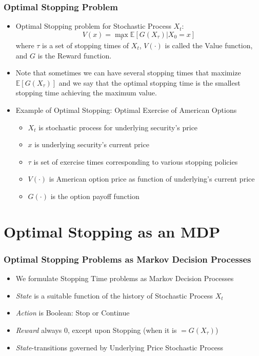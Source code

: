 \documentclass{beamer}
\begin{document}
\begin{frame}
\frametitle{Optimal Stopping Problem}
\begin{itemize}
\item Optimal Stopping problem for Stochastic Process $X_t$: 
$$V(x) = \max_{\tau} \mathbb{E}[G(X_{\tau})|X_0 = x]$$
 where $\tau$ is a set of stopping times of $X_t$, $V(\cdot)$ is called the Value function, and $G$ is the Reward function.
\item Note that sometimes we can have several stopping times that maximize $\mathbb{E}[G(X_{\tau})]$ and we say that the optimal stopping time
is the smallest stopping time achieving the maximum value.
\item Example of Optimal Stopping: Optimal Exercise of American Options
\begin{itemize}
\item $X_t$ is stochastic process for underlying security's price
\item $x$ is underlying security's current price
\item $\tau$ is set of exercise times corresponding to various stopping policies
\item $V(\cdot)$ is American option price as function of underlying's current price
\item $G(\cdot)$ is the option payoff function
\end{itemize}
\end{itemize}
\end{frame}

\section{Optimal Stopping as an MDP}

\begin{frame}
\frametitle{Optimal Stopping Problems as Markov Decision Processes}
\begin{itemize}
\item We formulate Stopping Time problems as Markov Decision Processes
\item {\em State} is a suitable function of the history of Stochastic Process $X_t$
\item {\em Action} is Boolean: Stop or Continue
\item {\em Reward} always 0, except upon Stopping (when it is $=G(X_{\tau})$)
\item {\em State}-transitions governed by Underlying Price Stochastic Process
\end{itemize}
\end{frame}
\end{document}
